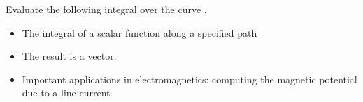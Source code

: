 \begin{ELexample}{}

Evaluate the following integral over the curve .


\begin{ELsolution}



\end{ELsolution}

\end{ELexample}

\begin{ELunit}

\begin{itemize}
\tightlist
\item
  The integral of a scalar function along a specified path
\end{itemize}


\begin{itemize}
\tightlist
\item
  The result is a vector.
\item
  Important applications in electromagnetics: computing the magnetic potential due to a line current
\end{itemize}


\end{ELunit}



